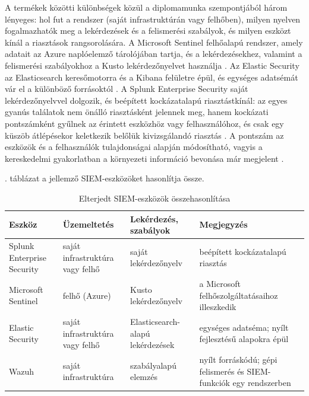 A termékek közötti különbségek közül a diplomamunka szempontjából három lényeges: hol fut a rendszer (saját infrastruktúrán vagy felhőben), milyen nyelven fogalmazhatók meg a lekérdezések és a felismerési szabályok, és milyen eszközt kínál a riasztások rangsorolására. A Microsoft Sentinel felhőalapú rendszer, amely adatait az Azure naplóelemző tárolójában tartja, és a lekérdezésekhez, valamint a felismerési szabályokhoz a Kusto lekérdezőnyelvet használja \cite{sentinelkql}. Az Elastic Security az Elasticsearch keresőmotorra és a Kibana felületre épül, és egységes adatsémát vár el a különböző forrásoktól \cite{elasticsecurity}. A Splunk Enterprise Security saját lekérdezőnyelvvel dolgozik, és beépített kockázatalapú riasztástkínál: az egyes gyanús találatok nem önálló riasztásként jelennek meg, hanem kockázati pontszámként gyűlnek az érintett eszközhöz vagy felhasználóhoz, és csak egy küszöb átlépésekor keletkezik belőlük kivizsgálandó riasztás \cite{splunkrba}. A pontszám az eszközök és a felhasználók tulajdonságai alapján módosítható, vagyis a kereskedelmi gyakorlatban a környezeti információ bevonása már megjelent \cite{splunkrba}.

\Az{\ref{tab:siem-eszkozok}}. táblázat a jellemző \ac{SIEM}-eszközöket hasonlítja össze.

\begin{table}[H]
    \centering
    \caption{Elterjedt SIEM-eszközök összehasonlítása}
    \label{tab:siem-eszkozok}
    \small
    \begin{tabular}{|L{2.6cm}|L{2.6cm}|L{3.4cm}|L{4.2cm}|}
        \hline
        \textbf{Eszköz} & \textbf{Üzemeltetés} & \textbf{Lekérdezés, szabályok} & \textbf{Megjegyzés} \\ \hline
        Splunk Enterprise Security & saját infrastruktúra vagy felhő & saját lekérdezőnyelv & beépített kockázatalapú riasztás \\ \hline
        Microsoft Sentinel & felhő (Azure) & Kusto lekérdezőnyelv & a Microsoft felhőszolgáltatásaihoz illeszkedik \\ \hline
        Elastic Security & saját infrastruktúra vagy felhő & Elasticsearch-alapú lekérdezések & egységes adatséma; nyílt fejlesztésű alapokra épül \\ \hline
        Wazuh & saját infrastruktúra & szabályalapú elemzés & nyílt forráskódú; gépi felismerés és SIEM-funkciók egy rendszerben \\ \hline
    \end{tabular}
\end{table}

